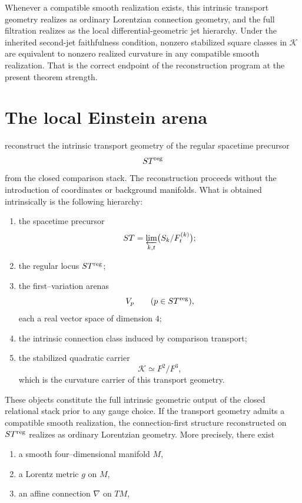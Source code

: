 Whenever a compatible smooth realization exists, this intrinsic
transport geometry realizes as ordinary Lorentzian connection geometry,
and the full filtration realizes as the local differential-geometric
jet hierarchy.  Under the inherited second-jet faithfulness condition,
nonzero stabilized square classes in \(\mathcal K\) are equivalent to
nonzero realized curvature in any compatible smooth realization.
That is the correct endpoint of the reconstruction program at the
present theorem strength.
\section{The local Einstein arena}
\label{sec:einstein-local-arena}
reconstruct the intrinsic transport geometry of
the regular spacetime precursor
\[
	ST^{\mathrm{reg}}
\]
from the closed comparison stack.  The reconstruction proceeds without
the introduction of coordinates or background manifolds.  What is
obtained intrinsically is the following hierarchy:
\begin{enumerate}[label=\textup{(\roman*)}]
	\item
	      the spacetime precursor
	      \[
		      ST=\varprojlim_{k,t}\bigl(S_k/F_t^{(k)}\bigr);
	      \]
	\item
	      the regular locus \(ST^{\mathrm{reg}}\);
	\item
	      the first--variation arenas
	      \[
		      V_p \qquad (p\in ST^{\mathrm{reg}}),
	      \]
	      each a real vector space of dimension \(4\);
	\item
	      the intrinsic connection class induced by comparison transport;
	\item
	      the stabilized quadratic carrier
	      \[
		      \mathcal K \simeq F^2/F^3,
	      \]
	      which is the curvature carrier of this transport geometry.
\end{enumerate}
These objects constitute the full intrinsic geometric output of the
closed relational stack prior to any gauge choice.
\medskip
If the transport geometry admits a compatible smooth realization, the
connection-first structure reconstructed on \(ST^{\mathrm{reg}}\) realizes as
ordinary Lorentzian geometry.  More precisely, there exist
\begin{enumerate}[label=\textup{(\roman*)}]
	\item
	      a smooth four--dimensional manifold \(M\),
	\item
	      a Lorentz metric \(g\) on \(M\),
	\item
	      an affine connection \(\nabla\) on \(TM\),
\end{enumerate}
